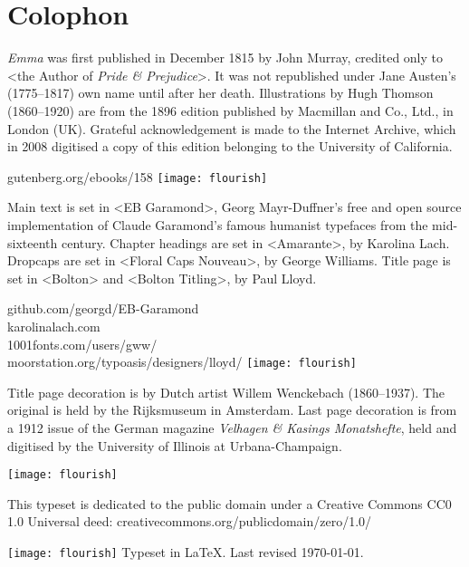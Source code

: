 \documentclass[
a5paper,
]{scrbook}
\begin{document}
\chapter*{Colophon}
\centering

\begin{minipage}{\textwidth}
\textit{Emma} was first published in December 1815 by John Murray, credited only to <the Author of \textit{Pride \& Prejudice}>. It was not republished under Jane Austen's (1775--1817) own name until after her death. Illustrations by Hugh Thomson (1860--1920) are from the 1896 edition published by Macmillan and Co., Ltd., in London (UK). Grateful acknowledgement is made to the Internet Archive, which in 2008 digitised a copy of this edition belonging to the University of California.
\end{minipage}
\vfill
gutenberg.org/ebooks/158
\vfill
\texttt{[image: flourish]}
\vfill
\begin{minipage}{\textwidth}
Main text is set in <EB Garamond>, Georg Mayr-Duffner's free and open source implementation of Claude Garamond’s famous humanist typefaces from the mid-sixteenth century. Chapter headings are set in <Amarante>, by Karolina Lach. Dropcaps are set in <Floral Caps Nouveau>, by George Williams. Title page is set in <Bolton> and <Bolton Titling>, by Paul Lloyd.
\end{minipage}
\vfill
github.com/georgd/EB-Garamond\\
karolinalach.com\\
1001fonts.com/users/gww/\\
moorstation.org/typoasis/designers/lloyd/
\vfill
\texttt{[image: flourish]}
\vfill
\begin{minipage}{\textwidth}
Title page decoration is by Dutch artist Willem Wenckebach (1860--1937). The original is held by the Rijksmuseum in Amsterdam. Last page decoration is from a 1912 issue of the German magazine \textit{Velhagen \& Kasings Monatshefte}, held and digitised by the University of Illinois at Urbana-Champaign.
\end{minipage}
\vfill
\texttt{[image: flourish]}
\vfill
\begin{minipage}{\textwidth}
This typeset is dedicated to the public domain under a Creative Commons CC0 1.0 Universal deed: creativecommons.org/publicdomain/zero/1.0/
\end{minipage}
\vfill
\texttt{[image: flourish]}
\vfill
Typeset in \LaTeX{}. Last revised \today.
\thispagestyle{empty}
\end{document}
